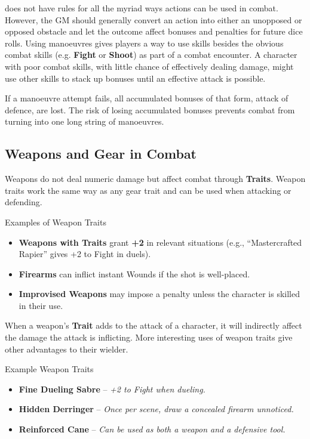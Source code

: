 \begin{multicols}{2}
\wyrd does not have rules for all the myriad ways actions can be used in combat. However, the GM should generally convert an action into either an unopposed or opposed obstacle and let the outcome affect bonuses and penalties for future dice rolls. Using manoeuvres gives players a way to use skills besides the obvious combat skills (e.g. \textbf{Fight} or \textbf{Shoot}) as part of a combat encounter. A character with poor combat skills, with little chance of effectively dealing damage, might use other skills to stack up bonuses until an effective attack is possible.

If a manoeuvre attempt fails, all accumulated bonuses of that form, attack of defence, are lost. The risk of losing accumulated bonuses prevents combat from turning into one long string of manoeuvres.

\subsection{Weapons and Gear in Combat}
Weapons do not deal numeric damage but affect combat through \textbf{Traits}. Weapon traits work the same way as any gear trait and can be used when attacking or defending.

\begin{Example}{Examples of Weapon Traits}
	\begin{itemize}
    	\item \textbf{Weapons with Traits} grant \textbf{+2} in relevant situations (e.g., “Mastercrafted Rapier” gives +2 to Fight in duels).
	    \item \textbf{Firearms} can inflict instant Wounds if the shot is well-placed.
    	\item \textbf{Improvised Weapons} may impose a penalty unless the character is skilled in their use.
	\end{itemize}
\end{Example}

When a weapon's \textbf{Trait} adds to the attack of a character, it will indirectly affect the damage the attack is inflicting. More interesting uses of weapon traits give other advantages to their wielder.

\begin{Example}{Example Weapon Traits}
	\begin{itemize}
    	\item \textbf{Fine Dueling Sabre} – \textit{+2 to Fight when dueling.}
	    \item \textbf{Hidden Derringer} – \textit{Once per scene, draw a concealed firearm unnoticed.}
	    \item \textbf{Reinforced Cane} – \textit{Can be used as both a weapon and a defensive tool.}
	\end{itemize}
\end{Example}


\end{multicols}

